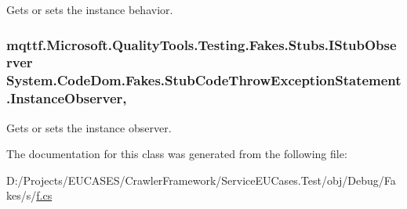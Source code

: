 Gets or sets the instance behavior.

\hypertarget{class_system_1_1_code_dom_1_1_fakes_1_1_stub_code_throw_exception_statement_ab1b81f135e2a5c3f2fd8adf2ca4da564}{
\subsubsection[{Instance\-Observer}]{\setlength{\rightskip}{0pt plus 5cm}mqttf.\-Microsoft.\-Quality\-Tools.\-Testing.\-Fakes.\-Stubs.\-I\-Stub\-Observer System.\-Code\-Dom.\-Fakes.\-Stub\-Code\-Throw\-Exception\-Statement.\-Instance\-Observer\hspace{0.3cm}{\ttfamily [get]}, {\ttfamily [set]}}}\label{class_system_1_1_code_dom_1_1_fakes_1_1_stub_code_throw_exception_statement_ab1b81f135e2a5c3f2fd8adf2ca4da564}


Gets or sets the instance observer.



The documentation for this class was generated from the following file\-:\begin{DoxyCompactItemize}
\item 
D\-:/\-Projects/\-E\-U\-C\-A\-S\-E\-S/\-Crawler\-Framework/\-Service\-E\-U\-Cases.\-Test/obj/\-Debug/\-Fakes/s/\hyperlink{s_2f_8cs}{f.\-cs}\end{DoxyCompactItemize}
